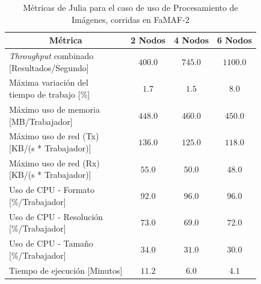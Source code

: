 \documentclass[11pt]{article}
\providecommand{\row}[1]{\parbox{150pt}{\setlength{\baselineskip}{0.2\baselineskip}\strut#1\strut}}
\newcommand{\ipcap}[2]{\caption{Métricas de #1 para el caso de uso de Procesamiento de Imágenes, corridas en #2}}
\newcommand{\english}[1]{\textit{#1}}
\begin{document}
\begin{table}[H]
\centering
\begin{tabular}{|l|c|c|c|}
\hline
\multicolumn{1}{|c|}{Métrica} & 2 Nodos & 4 Nodos & 6 Nodos \\ \hline
\row{\english{Throughput} combinado\\{[Resultados/Segundo]}} & $400.0$ & $745.0$ & $1100.0$ \\ \hline
\row{Máxima variación del \\ tiempo de trabajo {[}\%{]}} & $1.7$ & $1.5$ & $8.0$ \\ \hline
\row{Máximo uso de memoria \\ {[MB/Trabajador]}} & $448.0$ & $460.0$ & $450.0$ \\ \hline
\row{Máximo uso de red (Tx) \\ {[KB/(s * Trabajador)]}} & $136.0$ & $125.0$ & $118.0$ \\ \hline
\row{Máximo uso de red (Rx) \\ {[KB/(s * Trabajador)]}} & $55.0$ & $50.0$ & $48.0$ \\ \hline
\row{Uso de CPU - Formato\\{[\%/Trabajador]}} & $92.0$ & $96.0$ & $96.0$ \\ \hline
\row{Uso de CPU - Resolución\\{[\%/Trabajador]}} & $73.0$ & $69.0$ & $72.0$ \\ \hline
\row{Uso de CPU - Tamaño\\{[\%/Trabajador]}} & $34.0$ & $31.0$ & $30.0$ \\ \hline
Tiempo de ejecución [Minutos] & $11.2$ & $6.0$ & $4.1$ \\ \hline
\end{tabular}
\ipcap{Julia}{FaMAF-2}
\end{table}
\end{document}
